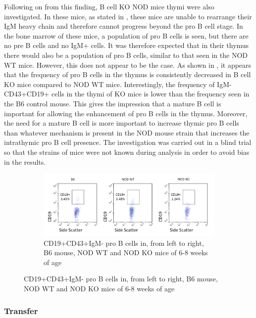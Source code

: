 Following on from this finding, B cell KO NOD mice thymi were also investigated.
In these mice, as stated in , these mice are unable to rearrange their IgM heavy chain and therefore cannot progress beyond the pro B cell stage. 
In the bone marrow of these mice, a population of pro B cells is seen, but there are no pre B cells and no IgM+ cells.
It was therefore expected that in their thymus there would also be a population of pro B cells, similar to that seen in the NOD WT mice. 
However, this does not appear to be the case.
As shown in , it appears that the frequency of pro B cells in the thymus is consistently decreased in B cell KO mice compared to NOD WT mice.
Interestingly, the frequency of IgM-CD43+CD19+ cells in the thymi of KO mice is lower than the frequency seen in the B6 control mouse. 
This gives the impression that a mature B cell is important for allowing the enhancement of pro B cells in the thymus.
Moreover, the need for a mature B cell is more important to increase thymic pro B cells than whatever mechanism is present in the NOD mouse strain that increases the intrathymic pro B cell presence.
The investigation was carried out in a blind trial so that the strains of mice were not known during analysis in order to avoid bias in the results.

\begin{figure}
	\begin{subfigure}{\textwidth}
	\includegraphics[width=\textwidth]{Figures/MatureBincproB.png}
	\caption{CD19+CD43+IgM- pro B cells in, from left to right, B6 mouse, NOD WT and NOD KO mice of 6-8 weeks of age}
	\end{subfigure}
\end{figure}


\subsubsection{Transfer}

